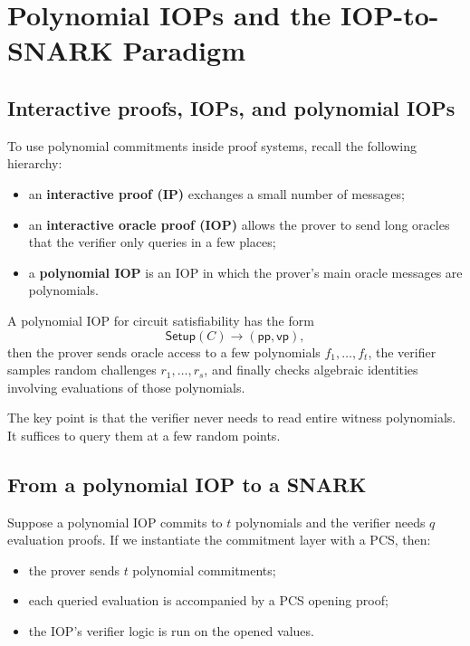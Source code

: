 \documentclass[11pt]{article}
\newcommand{\pp}{\mathsf{pp}}
\newcommand{\vp}{\mathsf{vp}}
\newcommand{\Setup}{\mathsf{Setup}}
\begin{document}
\section{Polynomial IOPs and the IOP-to-SNARK Paradigm}

\subsection{Interactive proofs, IOPs, and polynomial IOPs}

To use polynomial commitments inside proof systems, recall the following hierarchy:
\begin{itemize}[leftmargin=2em]
    \item an \textbf{interactive proof (IP)} exchanges a small number of messages;
    \item an \textbf{interactive oracle proof (IOP)} allows the prover to send long oracles that the verifier only queries in a few places;
    \item a \textbf{polynomial IOP} is an IOP in which the prover's main oracle messages are polynomials.
\end{itemize}

A polynomial IOP for circuit satisfiability has the form
\[
\Setup(C)\to (\pp,\vp),
\]
then the prover sends oracle access to a few polynomials $f_1,\dots,f_t$, the verifier samples random challenges $r_1,\dots,r_s$, and finally checks algebraic identities involving evaluations of those polynomials.

The key point is that the verifier never needs to read entire witness polynomials. It suffices to query them at a few random points.

\subsection{From a polynomial IOP to a SNARK}

Suppose a polynomial IOP commits to $t$ polynomials and the verifier needs $q$ evaluation proofs. If we instantiate the commitment layer with a PCS, then:
\begin{itemize}[leftmargin=2em]
    \item the prover sends $t$ polynomial commitments;
    \item each queried evaluation is accompanied by a PCS opening proof;
    \item the IOP's verifier logic is run on the opened values.
\end{itemize}
\end{document}
